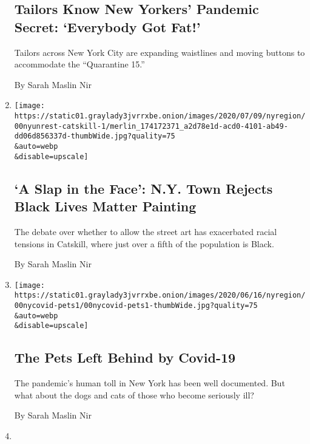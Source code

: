\begin{enumerate}
  \hypertarget{tailors-know-new-yorkers-pandemic-secret-everybody-got-fat}{%
  \subsection{Tailors Know New Yorkers' Pandemic Secret: `Everybody Got
  Fat!'}\label{tailors-know-new-yorkers-pandemic-secret-everybody-got-fat}}

  Tailors across New York City are expanding waistlines and moving
  buttons to accommodate the ``Quarantine 15.''

  By Sarah Maslin Nir
\item
  \href{/2020/07/13/nyregion/mural-black-lives-matter-catskill.html}{}

  \texttt{[image: https://static01.graylady3jvrrxbe.onion/images/2020/07/09/nyregion/00nyunrest-catskill-1/merlin\_174172371\_a2d78e1d-acd0-4101-ab49-dd06d856337d-thumbWide.jpg?quality=75\\\&auto=webp\\\&disable=upscale]}

  \hypertarget{a-slap-in-the-face-ny-town-rejects-black-lives-matter-painting}{%
  \subsection{`A Slap in the Face': N.Y. Town Rejects Black Lives Matter
  Painting}\label{a-slap-in-the-face-ny-town-rejects-black-lives-matter-painting}}

  The debate over whether to allow the street art has exacerbated racial
  tensions in Catskill, where just over a fifth of the population is
  Black.

  By Sarah Maslin Nir
\item
  \href{/2020/06/23/nyregion/coronavirus-pets.html}{}

  \texttt{[image: https://static01.graylady3jvrrxbe.onion/images/2020/06/16/nyregion/00nycovid-pets1/00nycovid-pets1-thumbWide.jpg?quality=75\\\&auto=webp\\\&disable=upscale]}

  \hypertarget{the-pets-left-behind-by-covid-19}{%
  \subsection{The Pets Left Behind by
  Covid-19}\label{the-pets-left-behind-by-covid-19}}

  The pandemic's human toll in New York has been well documented. But
  what about the dogs and cats of those who become seriously ill?

  By Sarah Maslin Nir
\item
  \href{/2020/06/21/nyregion/racist-video-rosedale-queens.html}{}


\end{enumerate}
